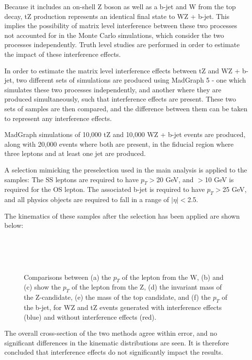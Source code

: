 Because it includes an on-shell Z boson as well as a b-jet and W from the top decay, tZ production represents an identical final state  to WZ + b-jet. This implies the possibility of matrix level interference between these two processes not accounted for in the Monte Carlo simulations, which consider the two processes independently. Truth level studies are performed in order to estimate the impact of these interference effects.    

In order to estimate the matrix level interference effects between tZ and WZ + b-jet, two different sets of simulations are produced using MadGraph 5 \cite{Madgraph} - one which simulates these two processes independently, and another where they are  produced simultaneously, such that interference effects are present. These two sets of samples are then compared, and the difference between them can be taken to represent any interference effects.

MadGraph simulations of 10,000 tZ and 10,000 WZ + b-jet events are produced, along with 20,000 events where both are present, in the fiducial region where three leptons and at least one jet are produced.  

A selection mimicking the preselection used in the main analysis is applied to the samples: The SS leptons are required to have $p_T>$20 GeV, and $>$10 GeV is required for the OS lepton. The associated b-jet is required to have $p_T>$25 GeV, and all physics objects are required to fall in a range of $|\eta|<$2.5. 

The kinematics of these samples after the selection has been applied are shown below:

\begin{figure}[H]
    \\
    \\
    \\
    \caption{Comparisons between (a) the $p_T$ of the lepton from the W, (b) and (c) show the $p_T$ of the lepton from the Z, (d)  the invariant mass of the Z-candidate, (e) the mass of the top candidate, and (f) the $p_T$ of the b-jet, for WZ and tZ events generated with interference effects (blue) and without interference effects (red).}
\end{figure}

The overall cross-section of the two methods agree within error, and no significant differences in the kinematic distributions are seen. It is therefore concluded that interference effects do not significantly impact the results.
